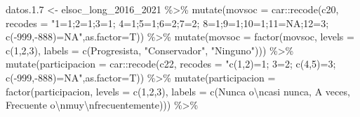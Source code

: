 \documentclass[
  12pt,
]{book}
\newenvironment{Shaded}{\begin{snugshade}}{\end{snugshade}}
\newcommand{\AttributeTok}[1]{\textcolor[rgb]{0.77,0.63,0.00}{#1}}
\newcommand{\DecValTok}[1]{\textcolor[rgb]{0.00,0.00,0.81}{#1}}
\newcommand{\FloatTok}[1]{\textcolor[rgb]{0.00,0.00,0.81}{#1}}
\newcommand{\FunctionTok}[1]{\textcolor[rgb]{0.00,0.00,0.00}{#1}}
\newcommand{\NormalTok}[1]{#1}
\newcommand{\OtherTok}[1]{\textcolor[rgb]{0.56,0.35,0.01}{#1}}
\newcommand{\SpecialCharTok}[1]{\textcolor[rgb]{0.00,0.00,0.00}{#1}}
\newcommand{\StringTok}[1]{\textcolor[rgb]{0.31,0.60,0.02}{#1}}
\begin{document}
\begin{Shaded}
\begin{Highlighting}[]
\NormalTok{datos.}\FloatTok{1.7} \OtherTok{\textless{}{-}}\NormalTok{ elsoc\_long\_2016\_2021 }\SpecialCharTok{\%\textgreater{}\%}
  \FunctionTok{mutate}\NormalTok{(}\AttributeTok{movsoc =}\NormalTok{ car}\SpecialCharTok{::}\FunctionTok{recode}\NormalTok{(c20, }\AttributeTok{recodes =} \StringTok{"1=\textquotesingle{}1\textquotesingle{};2=\textquotesingle{}1\textquotesingle{};3=\textquotesingle{}1\textquotesingle{};}
\StringTok{                                          4=\textquotesingle{}1\textquotesingle{};5=\textquotesingle{}1\textquotesingle{};6=\textquotesingle{}2\textquotesingle{};7=\textquotesingle{}2\textquotesingle{};}
\StringTok{                                          8=\textquotesingle{}1\textquotesingle{};9=\textquotesingle{}1\textquotesingle{};10=\textquotesingle{}1\textquotesingle{};11=NA;12=\textquotesingle{}3\textquotesingle{};}
\StringTok{                                          c({-}999,{-}888)=NA"}\NormalTok{,}\AttributeTok{as.factor=}\NormalTok{T)) }\SpecialCharTok{\%\textgreater{}\%} 
   \FunctionTok{mutate}\NormalTok{(}\AttributeTok{movsoc =} \FunctionTok{factor}\NormalTok{(movsoc, }\AttributeTok{levels =} \FunctionTok{c}\NormalTok{(}\DecValTok{1}\NormalTok{,}\DecValTok{2}\NormalTok{,}\DecValTok{3}\NormalTok{),}
                         \AttributeTok{labels =} \FunctionTok{c}\NormalTok{(}\StringTok{\textquotesingle{}Progresista\textquotesingle{}}\NormalTok{, }\StringTok{"Conservador"}\NormalTok{, }\StringTok{"Ninguno"}\NormalTok{))) }\SpecialCharTok{\%\textgreater{}\%}
  \FunctionTok{mutate}\NormalTok{(}\AttributeTok{participacion =}\NormalTok{ car}\SpecialCharTok{::}\FunctionTok{recode}\NormalTok{(c22, }\AttributeTok{recodes =} 
                         \StringTok{"c(1,2)=\textquotesingle{}1\textquotesingle{}; 3=\textquotesingle{}2\textquotesingle{};}
\StringTok{                          c(4,5)=\textquotesingle{}3\textquotesingle{};}
\StringTok{                          c({-}999,{-}888)=NA"}\NormalTok{,}\AttributeTok{as.factor=}\NormalTok{T)) }\SpecialCharTok{\%\textgreater{}\%}
    \FunctionTok{mutate}\NormalTok{(}\AttributeTok{participacion =} \FunctionTok{factor}\NormalTok{(participacion, }\AttributeTok{levels =} \FunctionTok{c}\NormalTok{(}\DecValTok{1}\NormalTok{,}\DecValTok{2}\NormalTok{,}\DecValTok{3}\NormalTok{),}
                         \AttributeTok{labels =} \FunctionTok{c}\NormalTok{(}\StringTok{\textquotesingle{}Nunca o}\SpecialCharTok{\textbackslash{}n}\StringTok{casi nunca\textquotesingle{}}\NormalTok{, }\StringTok{\textquotesingle{}A veces\textquotesingle{}}\NormalTok{, }\StringTok{\textquotesingle{}Frecuente o}\SpecialCharTok{\textbackslash{}n}\StringTok{muy}\SpecialCharTok{\textbackslash{}n}\StringTok{frecuentemente\textquotesingle{}}\NormalTok{))) }\SpecialCharTok{\%\textgreater{}\%}

\end{Highlighting}
\end{Shaded}
\end{document}
